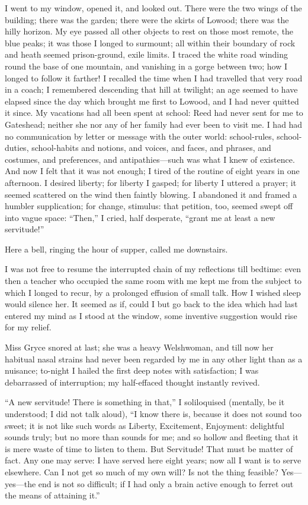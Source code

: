 I went to my window, opened it, and looked out. There were the two
wings of the building; there was the garden; there were the skirts of
Lowood; there was the hilly horizon. My eye passed all other objects to
rest on those most remote, the blue peaks; it was those I longed to
surmount; all within their boundary of rock and heath seemed
prison-ground, exile limits. I traced the white road winding round the
base of one mountain, and vanishing in a gorge between two; how I longed
to follow it farther! I recalled the time when I had travelled that
very road in a coach; I remembered descending that hill at twilight; an
age seemed to have elapsed since the day which brought me first to
Lowood, and I had never quitted it since. My vacations had all been
spent at school: \Mrs{} Reed had never sent for me to Gateshead; neither
she nor any of her family had ever been to visit me. I had had no
communication by letter or message with the outer world: school-rules,
school-duties, school-habits and notions, and voices, and faces, and
phrases, and costumes, and preferences, and antipathies---such was what
I knew of existence. And now I felt that it was not enough; I tired of
the routine of eight years in one afternoon. I desired liberty; for
liberty I gasped; for liberty I uttered a prayer; it seemed scattered on
the wind then faintly blowing. I abandoned it and framed a humbler
supplication; for change, stimulus: that petition, too, seemed swept off
into vague space: \enquote{Then,} I cried, half desperate,
\enquote{grant me at least a new servitude!}

Here a bell, ringing the hour of supper, called me downstairs.

I was not free to resume the interrupted chain of my reflections till
bedtime: even then a teacher who occupied the same room with me kept me
from the subject to which I longed to recur, by a prolonged effusion of
small talk. How I wished sleep would silence her. It seemed as if,
could I but go back to the idea which had last entered my mind as I
stood at the window, some inventive suggestion would rise for my relief.

Miss Gryce snored at last; she was a heavy Welshwoman, and till now her
habitual nasal strains had never been regarded by me in any other light
than as a nuisance; to-night I hailed the first deep notes with
satisfaction; I was debarrassed of interruption; my half-effaced thought
instantly revived.

\enquote{A new servitude! There is something in that,} I soliloquised
(mentally, be it understood; I did not talk aloud), \enquote{I know
	there is, because it does not sound too sweet; it is not like such words
	as Liberty, Excitement, Enjoyment: delightful sounds truly; but no more
	than sounds for me; and so hollow and fleeting that it is mere waste of
	time to listen to them. But Servitude! That must be matter of fact.
	Any one may serve: I have served here eight years; now all I want is to
	serve elsewhere. Can I not get so much of my own will? Is not the
	thing feasible? Yes---yes---the end is not so difficult; if I had only
	a brain active enough to ferret out the means of attaining it.}

